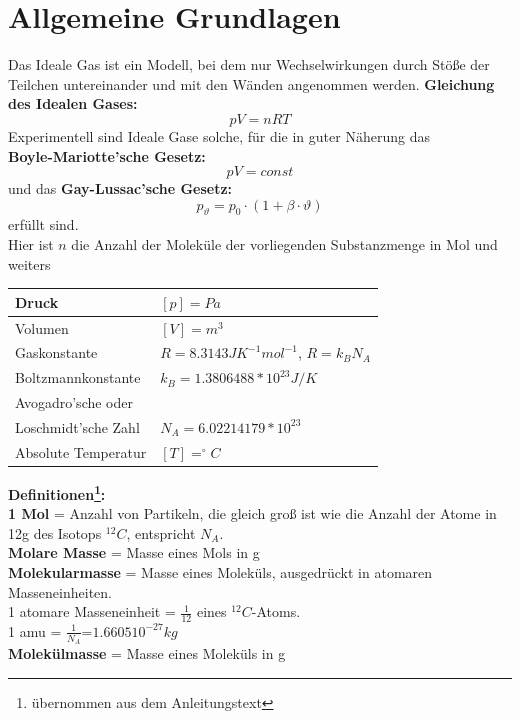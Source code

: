 \documentclass{article}
\begin{document}
\section{Allgemeine Grundlagen}
Das Ideale Gas ist ein Modell, bei dem nur Wechselwirkungen durch Stöße der Teilchen untereinander und mit den Wänden angenommen werden.
\textbf{Gleichung des Idealen Gases:}
\begin{equation}
\label{gasgleichung}
pV=nRT
\end{equation}
Experimentell sind Ideale Gase solche, für die in guter Näherung das\\ \textbf{Boyle-Mariotte'sche Gesetz:}
\begin{equation}
\label{boyle-mariotte}
pV=const
\end{equation}
und das \textbf{Gay-Lussac'sche Gesetz:}
\begin{equation}
\label{gay-lussac}
p_{\vartheta}=p_0\cdot (1+\beta \cdot \vartheta)
\end{equation}
erfüllt sind. 
\\
Hier ist $n$ die Anzahl der Moleküle der vorliegenden Substanzmenge in Mol und weiters
\begin{flushleft}
\begin{tabular}{|l|l|}
\hline Druck & $[p]=Pa$\\
\hline Volumen & $[V]=m^3$\\
\hline Gaskonstante & $R=8.3143 J K^{-1} mol^{-1}$, $R=k_B N_A$\\
\hline Boltzmannkonstante & $k_B=1.3806488*10^{23}J/K$\\
\hline Avogadro'sche oder &\\
Loschmidt'sche Zahl & $N_A=6.02214179*10^{23}$\\
\hline Absolute Temperatur & $[T]=^\circ C$\\
\hline
\end{tabular}
\end{flushleft}
\textbf{Definitionen\footnote{übernommen aus dem Anleitungstext}:}\\
\textbf{1 Mol} = Anzahl von Partikeln, die gleich groß ist wie die Anzahl der Atome in 12g des Isotops $^{12}C$, entspricht $N_A$. \\
\textbf{Molare Masse} = Masse eines Mols in g\\
\textbf{Molekularmasse} = Masse eines Moleküls, ausgedrückt in atomaren Masseneinheiten. \\
1 atomare Masseneinheit = $\frac{1}{12}$ eines $^{12}C$-Atoms.\\
1 amu = $\frac{1}{N_A}$=$1.6605 10^{-27}kg$\\
\textbf{Molekülmasse} = Masse eines Moleküls in g\\
\newpage
\end{document}
